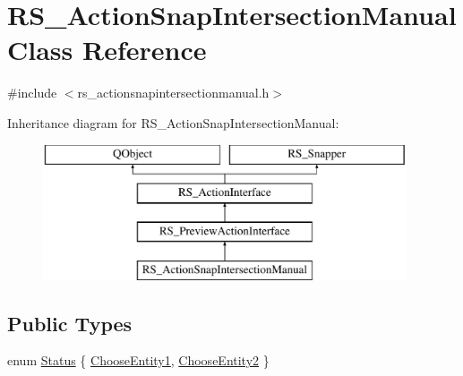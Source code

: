 \hypertarget{classRS__ActionSnapIntersectionManual}{\section{R\-S\-\_\-\-Action\-Snap\-Intersection\-Manual Class Reference}
\label{classRS__ActionSnapIntersectionManual}
}


{\ttfamily \#include $<$rs\-\_\-actionsnapintersectionmanual.\-h$>$}

Inheritance diagram for R\-S\-\_\-\-Action\-Snap\-Intersection\-Manual\-:\begin{figure}[H]
\begin{center}
\leavevmode
\includegraphics[height=4.000000cm]{classRS__ActionSnapIntersectionManual}
\end{center}
\end{figure}
\subsection*{Public Types}
\begin{DoxyCompactItemize}
\item 
enum \hyperlink{classRS__ActionSnapIntersectionManual_a2bc96661161c306e870325c2e9ff0846}{Status} \{ \hyperlink{classRS__ActionSnapIntersectionManual_a2bc96661161c306e870325c2e9ff0846acb083c57ed735509c64a78a0b566608d}{Choose\-Entity1}, 
\hyperlink{classRS__ActionSnapIntersectionManual_a2bc96661161c306e870325c2e9ff0846a0e864c5fe9fda3772c52460bc1412494}{Choose\-Entity2}
 \}
\end{DoxyCompactItemize}
